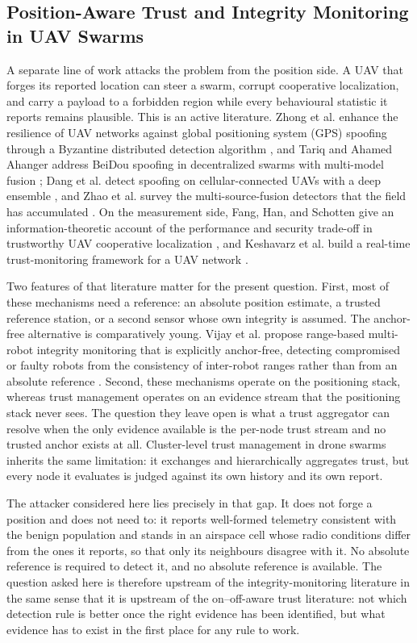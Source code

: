 \documentclass[notspecified,article,submit,moreauthors]{Definitions/mdpi}
\begin{document}
\subsection{Position-Aware Trust and Integrity Monitoring in UAV Swarms}
A separate line of work attacks the problem from the position side. A UAV that
forges its reported location can steer a swarm, corrupt cooperative
localization, and carry a payload to a forbidden region while every
behavioural statistic it reports remains plausible. This is an active
literature. Zhong et al. enhance the resilience of UAV networks against global
positioning system (GPS) spoofing through a Byzantine distributed detection
algorithm
\cite{zhong2026byzantine}, and Tariq and Ahamed Ahanger address BeiDou
spoofing in decentralized swarms with multi-model fusion
\cite{tariq2026beidou}; Dang et al. detect spoofing on cellular-connected UAVs
with a deep ensemble \cite{dang2022ensemble}, and Zhao et al. survey the
multi-source-fusion detectors that the field has accumulated
\cite{zhao2026gnssreview}. On the measurement side, Fang, Han, and Schotten
give an information-theoretic account of the performance and security
trade-off in trustworthy UAV cooperative localization \cite{fang2025trustworthy},
and Keshavarz et al. build a real-time trust-monitoring framework for a UAV
network \cite{keshavarz2020trustmonitor}.

Two features of that literature matter for the present question. First, most of
these mechanisms need a reference: an absolute position estimate, a trusted
reference station, or a second sensor whose own integrity is assumed. The
anchor-free alternative is comparatively young. Vijay et al. propose
range-based multi-robot integrity monitoring that is explicitly anchor-free,
detecting compromised or faulty robots from the consistency of inter-robot
ranges rather than from an absolute reference \cite{vijay2025anchorfree}.
Second, these mechanisms operate on the positioning stack, whereas trust
management operates on an evidence stream that the positioning stack never
sees. The question they leave open is what a trust aggregator can resolve when
the only evidence available is the per-node trust stream and no trusted anchor
exists at all. Cluster-level trust management in drone swarms
\cite{zuo2023blockchain} inherits the same limitation: it exchanges and
hierarchically aggregates trust, but every node it evaluates is judged against
its own history and its own report.

The attacker considered here lies precisely in that gap. It does not forge a
position and does not need to: it reports well-formed telemetry consistent
with the benign population and stands in an airspace cell whose radio
conditions differ from the ones it reports, so that only its neighbours
disagree with it. No absolute reference is required to detect it, and no
absolute reference is available. The question asked here is therefore upstream
of the integrity-monitoring literature in the same sense that it is upstream of
the on--off-aware trust literature: not which detection rule is better once the
right evidence has been identified, but what evidence has to exist in the first
place for any rule to work.
\end{document}
